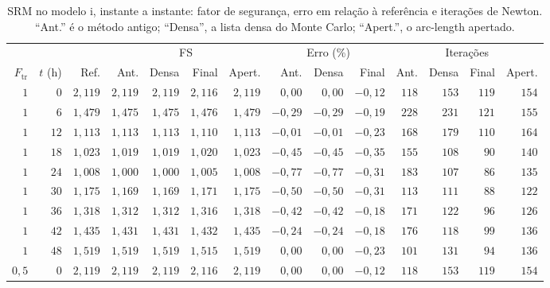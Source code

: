 \documentclass[11pt,a4paper]{article}
\numberwithin{equation}{section}
\begin{document}
\begin{table}[htbp]
\centering\footnotesize\setlength{\tabcolsep}{3pt}
\caption{SRM no modelo i, instante a instante: fator de segurança, erro em relação à referência e iterações de Newton. ``Ant.'' é o método antigo; ``Densa'', a lista densa do Monte Carlo; ``Apert.'', o arc-length apertado.}\label{tab:acoplado_casos_srm}
\begin{tabular}{rrrrrrrrrrrrrr}
\toprule
 &  &  & \multicolumn{4}{c}{FS} & \multicolumn{3}{c}{Erro (\%)} & \multicolumn{4}{c}{Iterações} \\ \cmidrule(lr){4-7}\cmidrule(lr){8-10}\cmidrule(lr){11-14} $F_{\mathrm{tr}}$ & $t$ (h) & Ref. & Ant. & Densa & Final & Apert. & Ant. & Densa & Final & Ant. & Densa & Final & Apert. \\
\midrule
$1$ & $0$ & $2{,}119$ & $2{,}119$ & $2{,}119$ & $2{,}116$ & $2{,}119$ & $0{,}00$ & $0{,}00$ & $-0{,}12$ & $118$ & $153$ & $119$ & $154$ \\
$1$ & $6$ & $1{,}479$ & $1{,}475$ & $1{,}475$ & $1{,}476$ & $1{,}479$ & $-0{,}29$ & $-0{,}29$ & $-0{,}19$ & $228$ & $231$ & $121$ & $155$ \\
$1$ & $12$ & $1{,}113$ & $1{,}113$ & $1{,}113$ & $1{,}110$ & $1{,}113$ & $-0{,}01$ & $-0{,}01$ & $-0{,}23$ & $168$ & $179$ & $110$ & $164$ \\
$1$ & $18$ & $1{,}023$ & $1{,}019$ & $1{,}019$ & $1{,}020$ & $1{,}023$ & $-0{,}45$ & $-0{,}45$ & $-0{,}35$ & $155$ & $108$ & $90$ & $140$ \\
$1$ & $24$ & $1{,}008$ & $1{,}000$ & $1{,}000$ & $1{,}005$ & $1{,}008$ & $-0{,}77$ & $-0{,}77$ & $-0{,}31$ & $183$ & $107$ & $86$ & $135$ \\
$1$ & $30$ & $1{,}175$ & $1{,}169$ & $1{,}169$ & $1{,}171$ & $1{,}175$ & $-0{,}50$ & $-0{,}50$ & $-0{,}31$ & $113$ & $111$ & $88$ & $122$ \\
$1$ & $36$ & $1{,}318$ & $1{,}312$ & $1{,}312$ & $1{,}316$ & $1{,}318$ & $-0{,}42$ & $-0{,}42$ & $-0{,}18$ & $171$ & $122$ & $96$ & $126$ \\
$1$ & $42$ & $1{,}435$ & $1{,}431$ & $1{,}431$ & $1{,}432$ & $1{,}435$ & $-0{,}24$ & $-0{,}24$ & $-0{,}18$ & $176$ & $118$ & $99$ & $136$ \\
$1$ & $48$ & $1{,}519$ & $1{,}519$ & $1{,}519$ & $1{,}515$ & $1{,}519$ & $0{,}00$ & $0{,}00$ & $-0{,}23$ & $101$ & $131$ & $94$ & $136$ \\
\midrule
$0{,}5$ & $0$ & $2{,}119$ & $2{,}119$ & $2{,}119$ & $2{,}116$ & $2{,}119$ & $0{,}00$ & $0{,}00$ & $-0{,}12$ & $118$ & $153$ & $119$ & $154$ \\

\end{tabular}
\end{table}
\end{document}
